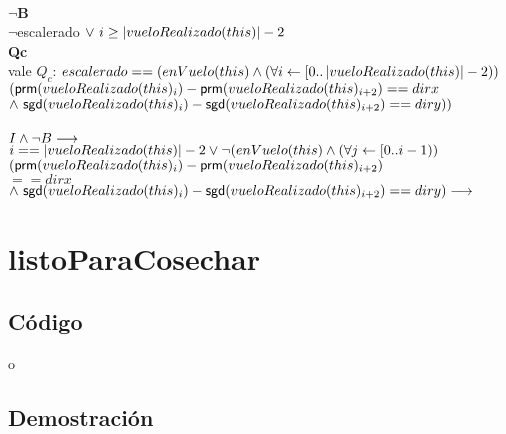 \documentclass[a4paper]{article}
\begin{document}
        \\
        \textbf{$\neg$B}\\
        $\neg$escalerado$ \ \vee \ i \geq \left| vueloRealizado(this) \right| - 2$
        \\ 
        \textbf{Qc}\\ 
        vale $Q_c$: $ escalerado == (enVuelo(this) \land (\forall i \leftarrow [0..\left| vueloRealizado(this) \right| - 2)) $ $ (\mathsf{prm}(vueloRealizado(this)_i) - \mathsf{prm}(vueloRealizado(this)_{i+2}) == dirx $ $ \land \ \mathsf{sgd}(vueloRealizado(this)_i) - \mathsf{sgd}(vueloRealizado(this)_{i+2}) == diry)) $ \\ 
        \\ $I \land \neg B \longrightarrow $\\ 
        $i == \left| vueloRealizado(this) \right| -2 \vee \neg (enVuelo(this) \land (\forall j \leftarrow [0..i -1)) $\\ $ (\mathsf{prm}(vueloRealizado(this)_i) - \mathsf{prm}(vueloRealizado(this)_{i+2})$\\$ == dirx $ $ \land \ \mathsf{sgd}(vueloRealizado(this)_i) - \mathsf{sgd}(vueloRealizado(this)_{i+2}) == diry) \longrightarrow $\\ 
        $ $ 

\newpage

\section{listoParaCosechar}

    \subsection{C\'odigo}
    o

    \subsection{Demostraci\'on}
        \noindent
       
\end{document}
